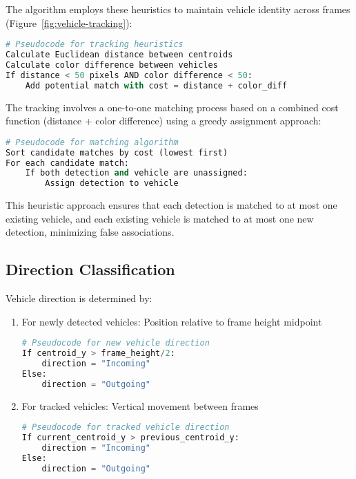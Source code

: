 \documentclass[9pt,a4paper,twoside]{rho-class/rho}
\begin{document}
    The algorithm employs these heuristics to maintain vehicle identity across frames (Figure~\ref{fig:vehicle-tracking}):
    
    \begin{lstlisting}[caption=Pseudocode for tracking heuristics, language=Python]
# Pseudocode for tracking heuristics
Calculate Euclidean distance between centroids
Calculate color difference between vehicles
If distance < 50 pixels AND color difference < 50:
    Add potential match with cost = distance + color_diff
    \end{lstlisting}
    
    The tracking involves a one-to-one matching process based on a combined cost function (distance + color difference) using a greedy assignment approach:
    
    \begin{lstlisting}[caption=Pseudocode for matching algorithm, language=Python]
# Pseudocode for matching algorithm
Sort candidate matches by cost (lowest first)
For each candidate match:
    If both detection and vehicle are unassigned:
        Assign detection to vehicle
    \end{lstlisting}
    
    This heuristic approach ensures that each detection is matched to at most one existing vehicle, and each existing vehicle is matched to at most one new detection, minimizing false associations.
    
    \subsection{Direction Classification}
    
    Vehicle direction is determined by:
    \begin{enumerate}
        \item For newly detected vehicles: Position relative to frame height midpoint
        \begin{lstlisting}[caption=Pseudocode for new vehicle direction, language=Python]
# Pseudocode for new vehicle direction
If centroid_y > frame_height/2:
    direction = "Incoming"
Else:
    direction = "Outgoing"
        \end{lstlisting}
        
        \item For tracked vehicles: Vertical movement between frames
        \begin{lstlisting}[caption=Pseudocode for tracked vehicle direction, language=Python]
# Pseudocode for tracked vehicle direction
If current_centroid_y > previous_centroid_y:
    direction = "Incoming"
Else:
    direction = "Outgoing"
        \end{lstlisting}
    \end{enumerate}
    
\end{document}
